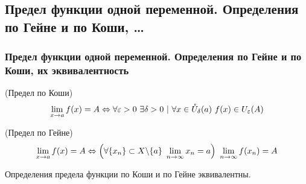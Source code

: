 \subsection{Предел функции одной переменной. Определения по Гейне и по Коши, \dots } %

\subsubsection{Предел функции одной переменной. Определения по Гейне и по Коши, их эквивалентность}

\begin{definition} (Предел по Коши)
	$$
		\lim\limits_{x \to a} f(x) = A \Leftrightarrow \forall \varepsilon > 0\ \exists \delta > 0\ |\ \forall x \in \mathring{U}_{\delta}(a)\ f(x) \in U_{\varepsilon}(A)
	$$
\end{definition}

\begin{definition} (Предел по Гейне)
	$$
		\lim\limits_{x \to a} f(x) = A \Leftrightarrow \left(\forall \{x_n\} \subset X \backslash \{a\}\ \lim\limits_{n \to \infty} x_n = a\right)\ \lim\limits_{n \to \infty} f(x_n) = A
	$$
\end{definition}

\begin{theorem}
	Определения предела функции по Коши и по Гейне эквивалентны.
\end{theorem}

